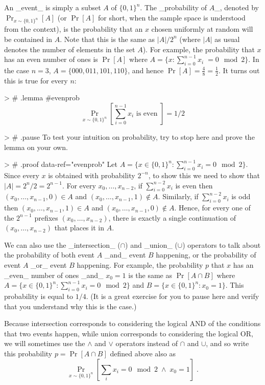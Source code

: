 An _event_ is simply a subset $A$ of $\{0,1\}^n$.
The _probability of $A$_, denoted by $\Pr_{x\sim \{0,1\}^n}[A]$ (or $\Pr[A]$ for short, when the sample space is understood from the context), is  the probability that an $x$ chosen uniformly at random will be  contained in $A$.
Note that this is the same as $|A|/2^n$ (where $|A|$ as usual denotes the number of elements in the set $A$).
For example, the probability that $x$ has an even number of ones is $\Pr[A]$ where $A=\{ x : \sum_{i=0}^{n-1} x_i \;= 0 \mod 2 \}$.
In the case $n=3$, $A=\{ 000,011,101,110 \}$, and hence $\Pr[A]=\tfrac{4}{8}=\tfrac{1}{2}$.
It turns out this is true for every $n$:

> # {.lemma #evenprob}
$$\Pr_{x\sim \{0,1\}^n}[ \text{$\sum_{i=0}^{n-1} x_i$ is even }] = 1/2$$

> # { .pause }
To test your intuition on probability, try to stop here and prove the lemma on your own.

> # {.proof data-ref="evenprob"}
Let $A = \{ x \in \{0,1\}^n :  \sum_{i=0}^{n-1} x_i = 0 \mod 2 \}$.
Since every $x$ is obtained with probability $2^{-n}$, to show this we need to show that $|A|=2^n/2=2^{n-1}$.
For every $x_0,\ldots,x_{n-2}$, if $\sum_{i=0}^{n-2} x_i$ is even then $(x_0,\ldots,x_{n-1},0)\in A$ and $(x_0,\ldots,x_{n-1},1) \not\in A$.
Similarly, if $\sum_{i=0}^{n-2} x_i$ is odd then $(x_0,\ldots,x_{n-1},1) \in A$ and  $(x_0,\ldots,x_{n-1},0)\not\in A$.
Hence, for every one of the $2^{n-1}$ prefixes $(x_0,\ldots,x_{n-2})$, there is exactly a single continuation of $(x_0,\ldots,x_{n-2})$ that places it in $A$.

We can also use the  _intersection_ ($\cap$) and _union_ ($\cup$) operators to talk about the probability of both event $A$ _and_ event $B$ happening, or the probability of event $A$ _or_ event $B$ happening.
For example, the probability $p$ that $x$ has an _even_ number of ones _and_ $x_0=1$ is the same as
$\Pr[A\cap B]$ where $A=\{ x\in \{0,1\}^n : \sum_{i=0}^{n-1} x_i =0 \mod 2 \}$ and $B=\{ x\in \{0,1\}^n : x_0 = 1 \}$.
This probability is equal to $1/4$. (It is a great exercise for you to pause here and verify that you understand why this is the case.)


Because intersection corresponds to considering  the logical AND of the conditions that two events happen, while union corresponds to considering the logical OR, we will sometimes use the $\wedge$ and $\vee$ operators instead of $\cap$ and $\cup$, and so write this probability $p=\Pr[A \cap B]$ defined above also as
$$
\Pr_{x\sim \{0,1\}^n} \left[ \sum_i x_i =0 \mod 2 \; \wedge \; x_0 = 1 \right] \;.
$$

